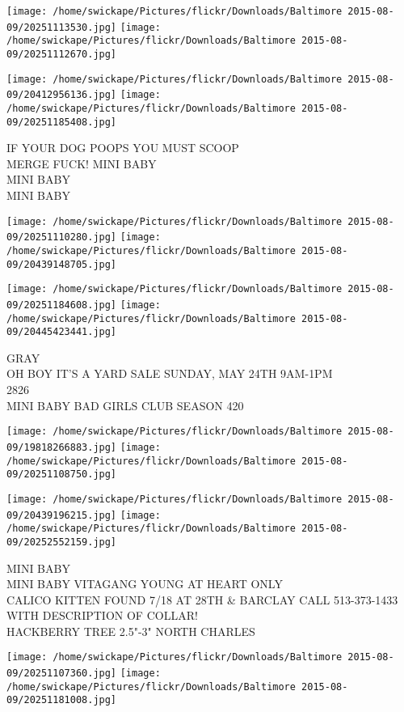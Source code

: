 \documentclass[10pt,letterpaper]{article}
\begin{document}
\texttt{[image: /home/swickape/Pictures/flickr/Downloads/Baltimore 2015-08-09/20251113530.jpg]}
\texttt{[image: /home/swickape/Pictures/flickr/Downloads/Baltimore 2015-08-09/20251112670.jpg]}

\texttt{[image: /home/swickape/Pictures/flickr/Downloads/Baltimore 2015-08-09/20412956136.jpg]}
\texttt{[image: /home/swickape/Pictures/flickr/Downloads/Baltimore 2015-08-09/20251185408.jpg]}

IF YOUR DOG POOPS YOU MUST SCOOP\\
MERGE FUCK! MINI BABY\\
MINI BABY\\
MINI BABY\\
\pagebreak

\texttt{[image: /home/swickape/Pictures/flickr/Downloads/Baltimore 2015-08-09/20251110280.jpg]}
\texttt{[image: /home/swickape/Pictures/flickr/Downloads/Baltimore 2015-08-09/20439148705.jpg]}

\texttt{[image: /home/swickape/Pictures/flickr/Downloads/Baltimore 2015-08-09/20251184608.jpg]}
\texttt{[image: /home/swickape/Pictures/flickr/Downloads/Baltimore 2015-08-09/20445423441.jpg]}

GRAY\\
OH BOY IT'S A YARD SALE SUNDAY, MAY 24TH 9AM{-}1PM\\
2826\\
MINI BABY BAD GIRLS CLUB SEASON 420\\
\pagebreak

\texttt{[image: /home/swickape/Pictures/flickr/Downloads/Baltimore 2015-08-09/19818266883.jpg]}
\texttt{[image: /home/swickape/Pictures/flickr/Downloads/Baltimore 2015-08-09/20251108750.jpg]}

\texttt{[image: /home/swickape/Pictures/flickr/Downloads/Baltimore 2015-08-09/20439196215.jpg]}
\texttt{[image: /home/swickape/Pictures/flickr/Downloads/Baltimore 2015-08-09/20252552159.jpg]}

MINI BABY\\
MINI BABY VITAGANG YOUNG AT HEART ONLY\\
CALICO KITTEN FOUND 7/18 AT 28TH \& BARCLAY CALL 513{-}373{-}1433 WITH DESCRIPTION OF COLLAR!\\
HACKBERRY TREE 2.5"{-}3" NORTH CHARLES\\
\pagebreak

\texttt{[image: /home/swickape/Pictures/flickr/Downloads/Baltimore 2015-08-09/20251107360.jpg]}
\texttt{[image: /home/swickape/Pictures/flickr/Downloads/Baltimore 2015-08-09/20251181008.jpg]}
\end{document}
